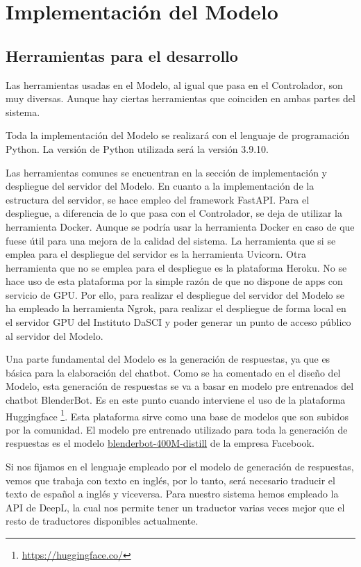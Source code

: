 \section{Implementación del Modelo} \label{sec:implementacion_modelo}

\subsection{Herramientas para el desarrollo}

Las herramientas usadas en el Modelo, al igual que pasa en el Controlador, son muy diversas. Aunque hay ciertas herramientas que coinciden en ambas partes del sistema.

Toda la implementación del Modelo se realizará con el lenguaje de programación Python. La versión de Python utilizada será la versión 3.9.10.

Las herramientas comunes se encuentran en la sección de implementación y despliegue del servidor del Modelo. En cuanto a la implementación de la estructura del servidor, se hace empleo del \gls{framework} FastAPI. Para el despliegue, a diferencia de lo que pasa con el Controlador, se deja de utilizar la herramienta Docker. Aunque se podría usar la herramienta Docker en caso de que fuese útil para una mejora de la calidad del sistema. La herramienta que si se emplea para el despliegue del servidor es la herramienta Uvicorn. Otra herramienta que no se emplea para el despliegue es la plataforma Heroku. No se hace uso de esta plataforma por la simple razón de que no dispone de apps con servicio de GPU. Por ello, para realizar el despliegue del servidor del Modelo se ha empleado la herramienta Ngrok, para realizar el despliegue de forma local en el servidor GPU del Instituto DaSCI y poder generar un punto de acceso público al servidor del Modelo.

Una parte fundamental del Modelo es la generación de respuestas, ya que es básica para la elaboración del chatbot. Como se ha comentado en el diseño del Modelo, esta generación de respuestas se va a basar en modelo pre entrenados del chatbot BlenderBot. Es en este punto cuando interviene el uso de la plataforma Huggingface \footnote{\url{https://huggingface.co/}}. Esta plataforma sirve como una base de modelos que son subidos por la comunidad. El modelo pre entrenado utilizado para toda la generación de respuestas es el modelo \href{https://huggingface.co/facebook/blenderbot-400M-distill}{blenderbot-400M-distill} de la empresa Facebook.

Si nos fijamos en el lenguaje empleado por el modelo de generación de respuestas, vemos que trabaja con texto en inglés, por lo tanto, será necesario traducir el texto de español a inglés y viceversa. Para nuestro sistema hemos empleado la API de DeepL, la cual nos permite tener un traductor varias veces mejor que el resto de traductores disponibles actualmente.

